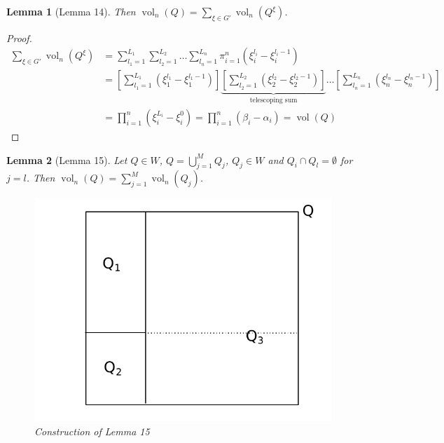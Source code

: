 \documentclass{article}
\newtheorem{lemma}{Lemma}  \numberwithin{lemma}{section}
\begin{document}
\begin{lemma}[Lemma 14]
  Then $\operatorname{vol}_n(Q) = \sum_{\xi \in G'} \operatorname{vol}_n(Q^\xi)$.
\end{lemma}

\begin{proof}
  \begin{align*}
    \sum_{\xi \in G'} \operatorname{vol}_n(Q^\xi) &= \sum_{l_1=1}^{L_1} \sum_{l_2=1}^{L_2} \ldots \sum_{l_n=1}^{L_n} \pi_{i=1}^n \left(\xi_i^{l_i} - \xi_i^{l_i - 1}\right) \\
      &= \left[\sum_{l_1=1}^{L_1} (\xi_1^{l_1} - \xi_1^{l_1-1})\right] \underbrace{\left[\sum_{l_2=1}^{L_2} (\xi_2^{l_2} - \xi_2^{l_2-1})\right]}_{\text{telescoping sum}} \ldots \left[\sum_{l_n=1}^{L_n} (\xi_n^{l_n} - \xi_n^{l_n-1})\right] \\
      &= \prod_{i=1}^n (\xi_i^{L_i} - \xi_i^0) = \prod_{i=1}^n (\beta_i - \alpha_i) = \operatorname{vol}(Q)
  \end{align*}
\end{proof}

\begin{lemma}[Lemma 15]
  Let $Q \in W$, $Q = \bigcup_{j=1}^M Q_j$, $Q_j \in W$ and $Q_i \cap Q_l = \emptyset$ for $j=l$.
  Then $\operatorname{vol}_n(Q) = \sum_{j=1}^M \operatorname{vol}_n(Q_j)$.

  \begin{figure}[!h]
    \begin{center}
      \includegraphics{img/10_lemma15.pdf}
      \caption{Construction of Lemma 15}
    \end{center}
  \end{figure}
\end{lemma}
\end{document}
